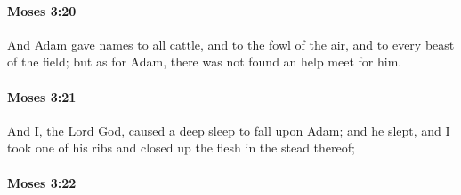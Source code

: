 
		\paragraph{Moses 3:20} %
			\label{MOSES-3-20}

			And Adam gave names to all cattle, and to the fowl of the air, and to every beast of the field; but as for Adam, there was not found an help meet for him.


		\paragraph{Moses 3:21} %
			\label{MOSES-3-21}

			And I, the Lord God, caused a deep sleep to fall upon Adam; and he slept, and I took one of his ribs and closed up the flesh in the stead thereof;


		\paragraph{Moses 3:22} %
			\label{MOSES-3-22}

